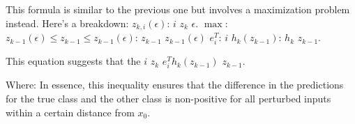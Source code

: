 This formula is similar to the previous one but involves a maximization problem instead. Here's a breakdown:
$z_{k,i}(\epsilon)$:  $i$  $z_k$  $\epsilon$.
$\max$: 
$z_{k-1}(\epsilon) \leq z_{k-1} \leq z_{k-1}(\epsilon)$:  $z_{k-1}$  $z_{k-1}(\epsilon)$ 
$e^T_i$:  $i$ 
$h_k(z_{k-1})$:  $h_k$  $z_{k-1}$.

This equation suggests that the $i$  $z_k$  $e^T_i h_k(z_{k-1})$  $z_{k-1}$.

Where:
In essence, this inequality ensures that the difference in the predictions for the true class and the other class is non-positive for all perturbed inputs within a certain distance from $x_0$.